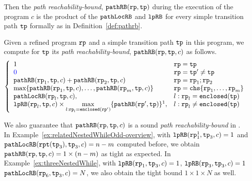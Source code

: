 Then the \emph{path reachability-bound}, $\mathtt{pathRB}(\mathtt{rp}, \mathtt{tp})$ during the execution of the program $c$ is the product of the $\mathtt{pathLocRB}$ and $\mathtt{lpRB}$ for every simple transition path $\mathtt{tp}$ formally as in Definition~\ref{def:pathrb}.
%
\begin{defn}
 \label{def:pathrb}
 Given a refined program $\mathtt{rp}$ and a simple transition path $\mathtt{tp}$ in this program, 
 we compute for $\mathtt{tp}$ its \emph{path reachability-bound}, $\mathtt{pathRB}(\mathtt{rp}, \mathtt{tp}, c)$
 as follows. 
{\small 
\[
 \left\{ 
 \begin{array}{ll}
 1 & \rprog = \tpath\\
 \highlight{0} & \rprog = \tpath' \neq \tpath\\
 \inoutB(\rprog_1, \tpath, c) + \inoutB(\rprog_2, \tpath, c) & \rprog = \rprog_1;\rprog_2 \\
 \max\left\{ \inoutB(\rprog_1, \tpath, c), \ldots, \inoutB(\rprog_m, \tpath, c) \right\} 
 & \rprog = \rpchoose{\rprog_1, \ldots, \rprog_m } \\
 \outinB(\rprog_l, \tpath, c), & l: \rprog_l = \kw{enclosed}(\tpath) \\
 \lpchB(\rprog_l, \tpath , c)
 \times \max\limits_{l:\rprog_l = \kw{enclosed}(\rprog')}
 \{\inoutB(\rprog', \tpath)\} \footnotemark, & l: \rprog_l \neq \kw{enclosed}(\tpath) \\
 \end{array}
 \right.
 \]
 }
 \end{defn}

We also guarantee that $\mathtt{pathRB}(\mathtt{rp}, \mathtt{tp}, c)$ is a sound \emph{path reachability-bound}
in .
%
In Example~\ref{ex:relatedNestedWhileOdd-overview}, with $\mathtt{lpRB}(\mathtt{rp}_1^1, \mathtt{tp}_3, c) = 1$ and
$\mathtt{pathLocRB}(\mathtt{rpt}(\mathtt{tp}_3), \mathtt{tp}_3, c) = n - m$ computed before,
we obtain $\mathtt{pathRB}(\mathtt{rp}, \mathtt{tp}, c) = 1 \times (n - m)$ as tight as expected.
In Example~\ref{ex:threeNestedWhile}, with $\mathtt{lpRB}(\mathtt{rp}_1, \mathtt{tp}_3, c) = 1$,
$\mathtt{lpRB}(\mathtt{rp}_3, \mathtt{tp}_3, c) = 1$
$\mathtt{pathLocRB}(\mathtt{rp}_6, \mathtt{tp}_3, c) = N$,
we also obtain the tight bound $1 \times 1 \times N$ as well.

